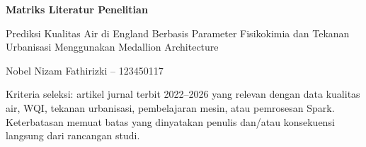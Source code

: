 \documentclass[10pt,a4paper]{article}
\begin{document}
\begin{center}
    {\Large\bfseries Matriks Literatur Penelitian}\par
    \vspace{2pt}
    {\normalsize Prediksi Kualitas Air di England Berbasis Parameter Fisikokimia dan Tekanan Urbanisasi Menggunakan Medallion Architecture}\par
    \vspace{2pt}
    Nobel Nizam Fathirizki -- 123450117
\end{center}

\vspace{5pt}
{\footnotesize Kriteria seleksi: artikel jurnal terbit 2022--2026 yang relevan dengan data kualitas air, WQI, tekanan urbanisasi, pembelajaran mesin, atau pemrosesan Spark. Keterbatasan memuat batas yang dinyatakan penulis dan/atau konsekuensi langsung dari rancangan studi.}
\end{document}
